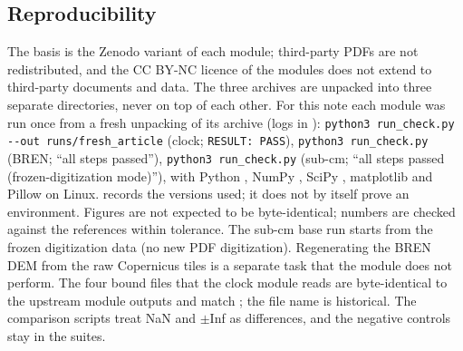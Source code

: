 \documentclass[11pt,a4paper]{article}
\begin{document}
\subsection{Reproducibility}
The basis is the Zenodo variant of each module; third-party PDFs are not redistributed, and the CC BY-NC licence of the
modules does not extend to third-party documents and data. The three archives are unpacked into three separate directories,
never on top of each other. For this note each module was run once from a fresh unpacking of its archive (logs in
): \texttt{python3 run\_check.py -{}-out runs/fresh\_article} (clock; \texttt{RESULT: PASS}),
\texttt{python3 run\_check.py} (BREN; ``all steps passed''), \texttt{python3 run\_check.py} (sub-cm; ``all steps passed
(frozen-digitization mode)''), with Python , NumPy , SciPy , matplotlib  and Pillow
 on Linux.  records the versions used; it does not by itself prove an environment.
Figures are not expected to be byte-identical; numbers are checked against the references within tolerance.
The sub-cm base run starts from the frozen digitization data (no new PDF digitization). Regenerating the BREN DEM from the
raw Copernicus tiles is a separate task that the module does not perform. The four bound files that the clock module reads
are byte-identical to the upstream module outputs and match ; the file name
 is historical. The comparison scripts treat NaN and $\pm$Inf as differences,
and the negative controls stay in the suites.
\end{document}
